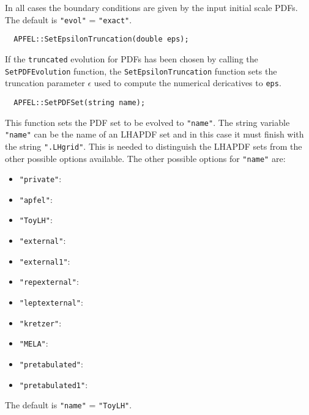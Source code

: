 \documentclass[11pt,a4paper]{article}
\begin{document}
In all cases the boundary conditions are given by the input initial
scale PDFs. The default is {\tt "evol"} = {\tt "exact"}.
\begin{lstlisting}
  APFEL::SetEpsilonTruncation(double eps);
\end{lstlisting}
If the {\tt truncated} evolution for PDFs has been chosen by calling
the {\tt SetPDFEvolution} function, the {\tt SetEpsilonTruncation}
function sets the truncation parameter $\epsilon$ used to compute the
numerical dericatives to {\tt eps}.
\begin{lstlisting}
  APFEL::SetPDFSet(string name);
\end{lstlisting}
This function sets the PDF set to be evolved to {\tt "name"}. The
string variable {\tt "name"} can be the name of an LHAPDF set and in
this case it must finish with the string {\tt ".LHgrid"}. This is
needed to distinguish the LHAPDF sets from the other possible options
available. The other possible options for {\tt "name"} are:
\begin{itemize}
\item {\tt "private"}:
\item {\tt "apfel"}:
\item {\tt "ToyLH"}:
\item {\tt "external"}:
\item {\tt "external1"}:
\item {\tt "repexternal"}:
\item {\tt "leptexternal"}:
\item {\tt "kretzer"}:
\item {\tt "MELA"}:
\item {\tt "pretabulated"}:
\item {\tt "pretabulated1"}:
\end{itemize}
The default is {\tt "name"} = {\tt "ToyLH"}.
\end{document}
